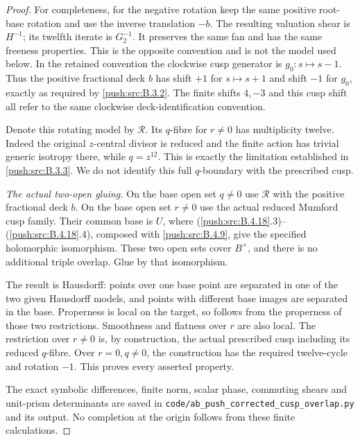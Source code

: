 \begin{proof}
For completeness, for the negative rotation keep the same positive
root-base rotation and use the inverse translation
$-b$. The resulting valuation shear is $H^{-1}$;
its twelfth iterate is $G_2^{-1}$. It preserves
the same fan and has the same freeness properties.
This is the opposite convention and is not the model
used below. In the retained convention the clockwise
cusp generator is $g_0:s\mapsto s-1$. Thus the
positive fractional deck $b$ has shift $+1$ for
$s\mapsto s+1$ and shift $-1$ for $g_0$, exactly
as required by \ref{push:src:B.3.2}. The finite shifts $4,-3$
and this cusp shift all refer to the same clockwise
deck-identification convention.

Denote this rotating model by $\mathcal R$.
Its $q$-fibre for $r\ne0$ has multiplicity twelve.
Indeed the original $z$-central divisor is reduced
and the finite action has trivial generic isotropy
there, while $q=z^{12}$. This is exactly the
limitation established in \ref{push:src:B.3.3}. We do not identify
this full $q$-boundary with the prescribed cusp.

\emph{The actual two-open gluing.}
On the base open set $q\ne0$ use $\mathcal R$ with
the positive fractional deck $b$. On the base open set $r\ne0$
use the actual reduced Mumford cusp family.
Their common base is $U$, where (\ref{push:src:B.4.18}.3)--
(\ref{push:src:B.4.18}.4), composed with \ref{push:src:B.4.9}, give the specified
holomorphic isomorphism. These two open sets cover
$B^\times$, and there is no additional triple
overlap. Glue by that isomorphism.

The result is Hausdorff: points over one base
point are separated in one of the two given
Hausdorff models, and points with different
base images are separated in the base.
Properness is local on the target, so follows
from the properness of those two restrictions.
Smoothness and flatness over $r$ are also local.
The restriction over $r\ne0$ is, by construction,
the actual prescribed cusp including its reduced
$q$-fibre. Over $r=0,q\ne0$, the construction has
the required twelve-cycle and rotation $-1$.
This proves every asserted property.

The exact symbolic differences, finite norm,
scalar phase, commuting shears and unit-prism
determinants are saved in
\texttt{code/ab\_push\_corrected\_cusp\_overlap.py}
and its output. No completion at the origin
follows from these finite calculations.
\end{proof}

